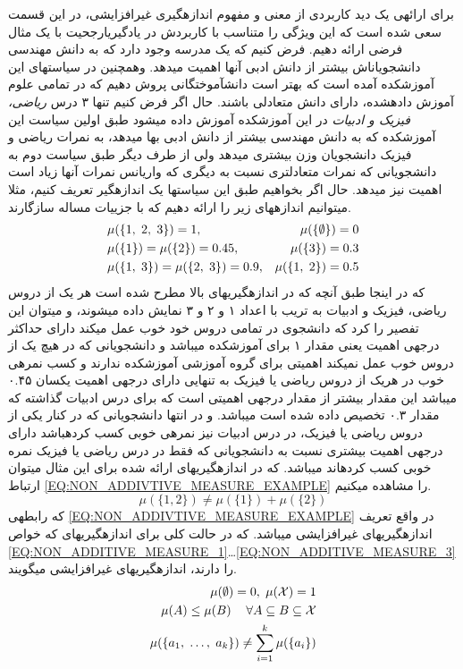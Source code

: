 \documentclass[journal]{IEEEtran}
\newcommand{\نیمفاصله}{\halfspace}
\renewcommand{\ }{\halfspace}
\renewcommand{\یا}{یادگیری\ ارجحیت }
\newcommand{\یم}{یادگیری\ ماشین }
\renewcommand{\تر}{تابع رتبه\ بند }
\newcommand{\ار}{ارجحیت }
\renewcommand{\|}[1][.3em]{\hspace{#1}|\hspace{#1}}
\renewcommand{\,}[1][.3em]{,\hspace{#1}}
\begin{document}
\زیرقسمت{اندازه\ گیری غیرافزایشی}
\label{SEC:NON_ADDITIVE_MEASURE}
برای ارائه\ ی یک دید کاربردی از معنی و مفهوم اندازه\ گیری غیرافزایشی، در این قسمت سعی شده است که این ویژگی را متناسب با کاربردش در \یا با یک مثال فرضی ارائه دهیم.
فرض کنیم که یک مدرسه وجود دارد که به دانش مهندسی دانشجویان\ اش بیشتر از دانش ادبی آن\ ها اهمیت می\ دهد. وهمچنین در سیاست\ های این آموزشکده آمده است که بهتر است دانش\ آموختگانی پروش دهیم که در تمامی علوم آموزش داده\ شده، دارای دانش متعادلی باشند. حال اگر فرض کنیم تنها ۳ درس \emph{ریاضی، فیزیک و ادبیات} در این آموزشکده آموزش داده می\ شود طبق اولین سیاست این آموزشکده که به دانش مهندسی بیشتر از دانش ادبی بها می\ دهد، به نمرات ریاضی و فیزیک دانشجویان وزن بیشتری می\ دهد ولی از طرف دیگر طبق سیاست دوم به دانشجویانی که نمرات متعادل\ تری نسبت به دیگری که واریانس نمرات آن\ ها زیاد است اهمیت نیز می\ دهد.
حال اگر بخواهیم طبق این سیاست\ ها یک اندازه\ گیر تعریف کنیم، مثلا می\ توانیم اندازه\ های زیر را ارائه دهیم که با جزییات مساله سازگارند.
\begin{align*}
&\mu(\{1\,2\,3\}) = 1,&\mu(\{\emptyset\}) = 0\\
&\mu(\{1\}) = \mu(\{2\}) = 0.45,&\mu(\{3\}) = 0.3\\
&\mu(\{1\,3\}) = \mu(\{2\,3\}) = 0.9,&\mu(\{1\,2\}) = 0.5
\end{align*}
که در اینجا طبق آنچه که در اندازه\ گیری\ های بالا مطرح شده است هر یک از دروس ریاضی، فیزیک و ادبیات به تریب با اعداد ۱ و ۲ و ۳ نمایش داده می\ شوند، و می\ توان این تفصیر را کرد که دانشجوی در تمامی دروس خود خوب عمل می\ کند دارای حداکثر درجه\ ی اهمیت یعنی مقدار ۱ برای آموزشکده می\ باشد و دانشجویانی که در هیچ یک از دروس خوب عمل نمی\ کند اهمیتی برای گروه آموزشی آموزشکده ندارند و کسب نمره\ ی خوب در هریک از دروس ریاضی یا فیزیک به تنهایی دارای درجه\ ی اهمیت یکسان ۰.۴۵ می\ باشد این مقدار بیشتر از مقدار درجه\ ی اهمیتی است که برای درس ادبیات گذاشته که مقدار ۰.۳ تخصیص داده شده است می\ باشد. و در انتها دانشجویانی که در کنار یکی از دروس ریاضی یا فیزیک، در درس ادبیات نیز نمره\ ی خوبی کسب کرده\ باشد دارای درجه\ ی اهمیت بیشتری نسبت به دانشجویانی که فقط در درس ریاضی یا فیزیک نمره خوبی کسب کرده\ اند می\ باشد. که در اندازه\ گیری\ های ارائه شده برای این مثال می\ توان ارتباط
\ref{EQ:NON_ADDIVTIVE_MEASURE_EXAMPLE}
را مشاهده می\ کنیم.
\begin{equation}\label{EQ:NON_ADDIVTIVE_MEASURE_EXAMPLE}
\mu(\{1, 2\}) \neq \mu(\{1\}) + \mu(\{2\})
\end{equation}
که رابطه\ ی
\ref{EQ:NON_ADDIVTIVE_MEASURE_EXAMPLE}
در واقع تعریف اندازه\ گیری\ های غیرافزایشی می\ باشد. که در حالت کلی برای اندازه\ گیری\ های که خواص
\ref{EQ:NON_ADDITIVE_MEASURE_1}\ldots\ref{EQ:NON_ADDITIVE_MEASURE_3}
را دارند،‌ اندازه\ گیری\ های غیرافزایشی می\ گویند.
\begin{eqnarray}
\mu(\emptyset) = 0\, \mu(\mathcal{X}) = 1\label{EQ:NON_ADDITIVE_MEASURE_1}\\
\mu(A) \leq \mu(B)\hspace{1.2em}\forall A \subseteq B \subseteq \mathcal{X}\label{EQ:NON_ADDITIVE_MEASURE_2}\\
\mu(\{a_1\,\ldots\,a_k\}) \neq \sum_{i = 1}^{k} \mu(\{a_i\})\label{EQ:NON_ADDITIVE_MEASURE_3}
\end{eqnarray}
\end{document}
